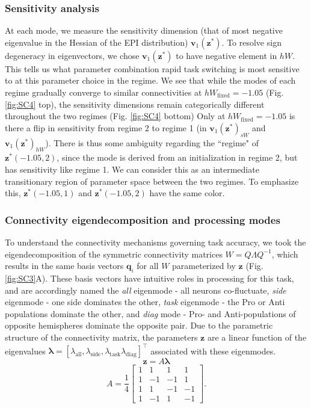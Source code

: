 \documentclass[11pt]{article}
\begin{document}
\subsubsection{Sensitivity analysis} \label{methods_sc_hessian}
At each mode, we measure the sensitivity dimension (that of most negative eigenvalue in the Hessian of the EPI distribution) $\mathbf{v}_1(\mathbf{z}^*)$.
To resolve sign degeneracy in eigenvectors, we chose $\mathbf{v}_1(\mathbf{z}^*)$ to have negative element in $hW$.
This tells us what parameter combination rapid task switching is most sensitive to at this parameter choice in the regime.
We see that while the modes of each regime gradually converge to similar connectivities at $hW_{\text{fixed}} = -1.05$ (Fig. \ref{fig:SC4} top), the sensitivity dimensions remain categorically different throughout the two regimes (Fig. \ref{fig:SC4} bottom)
Only at $hW_{\text{fixed}} = -1.05$ is there a flip in sensitivity from regime 2 to regime 1 (in $\mathbf{v}_1(\mathbf{z}^*)_{sW}$ and $\mathbf{v}_1(\mathbf{z}^*)_{hW}$).
There is thus some ambiguity regarding the ``regime" of $\mathbf{z}^*(-1.05, 2)$, since the mode is derived from an initialization in regime 2, but has sensitivity like regime 1.
We can consider this as an intermediate transitionary region of parameter space between the two regimes.
To emphasize this, $\mathbf{z}^*(-1.05, 1)$ and $\mathbf{z}^*(-1.05, 2)$ have the same color.

\subsubsection{Connectivity eigendecomposition and processing modes} \label{methods_sc_eig}
To understand the connectivity mechanisms governing task accuracy, we took the eigendecomposition of the symmetric connectivity matrices $W = Q\Lambda Q^{-1}$, which results in the same basis vectors $\mathbf{q}_i$ for all $W$ parameterized by $\mathbf{z}$ (Fig. \ref{fig:SC3}A). 
These basis vectors have intuitive roles in processing for this task, and are accordingly named the \textit{all} eigenmode - all neurons co-fluctuate, \textit{side} eigenmode - one side dominates the other, \textit{task} eigenmode - the Pro or Anti populations dominate the other, and \textit{diag} mode - Pro- and Anti-populations of opposite hemispheres dominate the opposite pair. 
Due to the parametric structure of the connectivity matrix, the parameters $\mathbf{z}$ are a linear function of the eigenvalues $\bm{\lambda} = [\lambda_{\text{all}}, \lambda_{\text{side}}, \lambda_{\text{task}}\lambda_{\text{diag}}]^\top$ associated with these eigenmodes.
\begin{equation}
\mathbf{z} = A\bm{\lambda}
\end{equation}
\begin{equation}
A = \frac{1}{4} \begin{bmatrix} 1 & 1 & 1 & 1 \\ 1 & -1 & -1 & 1 \\ 1 & 1 & -1 & -1 \\ 1 & -1 & 1 & -1 \end{bmatrix}.
\end{equation}
\end{document}
